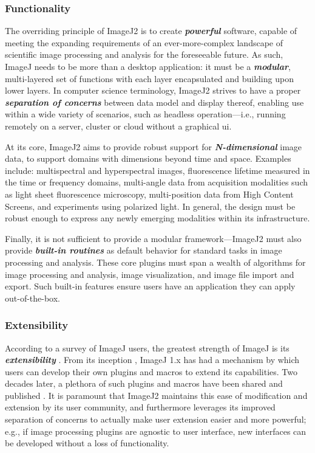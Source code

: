 \documentclass{bmcart}
\begin{document}
\subsubsection*{Functionality}
The overriding principle of ImageJ2 is to create \textbf{\textit{powerful}}
software, capable of meeting the expanding requirements of an ever-more-complex
landscape of scientific image processing and analysis for the foreseeable
future. As such, ImageJ needs to be more than a desktop application: it must be
a
\textbf{\textit{modular}}, multi-layered set of functions with each layer
encapsulated and building upon lower layers. In computer science terminology,
ImageJ2 strives to have a proper \textbf{\textit{separation of concerns}}
between data model and display thereof, enabling use within a wide variety of
scenarios, such as headless operation---i.e., running remotely on a server,
cluster or cloud without a graphical \acrfull{ui}.

At its core, ImageJ2 aims to provide robust support for
\textbf{\textit{N-dimensional}} image data, to support domains with dimensions
beyond time and space. Examples include: multispectral and hyperspectral
images, fluorescence lifetime measured in the time or frequency domains,
multi-angle data from acquisition modalities such as light sheet fluorescence
microscopy, multi-position data from High Content Screens, and experiments
using polarized light. In general, the design must be robust enough to express
any newly emerging modalities within its infrastructure.

Finally, it is not sufficient to provide a modular framework---ImageJ2 must
also provide \textbf{\textit{built-in routines}} as default behavior for
standard tasks in image processing and analysis. These core plugins must span a
wealth of algorithms for image processing and analysis, image visualization,
and image file import and export. Such built-in features ensure users have an
application they can apply out-of-the-box.

\subsubsection*{Extensibility}
According to a survey of ImageJ users, the greatest strength of ImageJ is its
\textbf{\textit{extensibility}} \cite{imagej_survey}. From its inception
\cite{imagej_history},
ImageJ 1.x has had a mechanism by which users can develop their own plugins and
macros to extend its capabilities. Two decades later, a plethora of such
plugins and macros have been shared and published \cite{imagej_ecosystem}. It
is paramount that ImageJ2 maintains this ease of modification and extension by
its user community, and furthermore leverages its improved separation of
concerns to actually make user extension easier and more powerful; e.g., if
image processing plugins are agnostic to user interface, new interfaces can be
developed without a loss of functionality.
\end{document}

